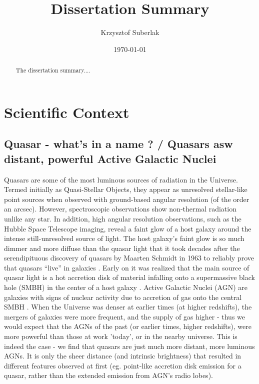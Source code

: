 \documentclass[modern]{aastex62}
\begin{document}
\title{Dissertation Summary}
\author{Krzysztof Suberlak}

\date{ \today
}

\begin{abstract}
The dissertation summary.... 
\end{abstract}

\section{Scientific Context}

\subsection{Quasar - what's in a name ? / Quasars asw distant, powerful Active Galactic Nuclei}
Quasars are some of the most luminous sources of radiation in the Universe.  Termed initially as Quasi-Stellar Objects, they appear as unresolved stellar-like point sources when observed with ground-based angular resolution (of the order an arcsec). However, spectroscopic observations show non-thermal radiation unlike any star. In addition, high angular resolution observations, such as the Hubble Space Telescope imaging, reveal a faint glow of a host galaxy around the intense still-unresolved source of light. The host galaxy's faint glow is so much dimmer and more diffuse than the quasar light that it took decades after the serendipituous discovery of quasars by Maarten Schmidt in 1963 \citep{schmidt1963, richards2009a} to reliably prove that quasars “live” in galaxies \citep{hooper1997, boyce1999, lehnert1999}. Early on it was realized that the main source of quasar light is a hot accretion disk of material infalling onto a supermassive black hole (SMBH) in the center of a host galaxy \citep{oke1965, burbidge1967}. Active Galactic Nuclei (AGN) are galaxies with signs of nuclear activity due to accretion of gas onto the central SMBH \citep{netzer2013}. When the Universe was denser at earlier times (at higher redshifts), the mergers of galaxies were more frequent, and the supply of gas higher -  thus we would expect that the AGNs of the past (or earlier times, higher redshifts), were more powerful than those at work 'today', or in the nearby universe. This is indeed the case - we find that quasars are just much more distant, more luminous AGNs. It is only the sheer distance (and intrinsic brightness) that resulted in different features observed at first (eg. point-like accretion disk emission for a quasar, rather than the extended emission from AGN's radio lobes).  
\end{document}
